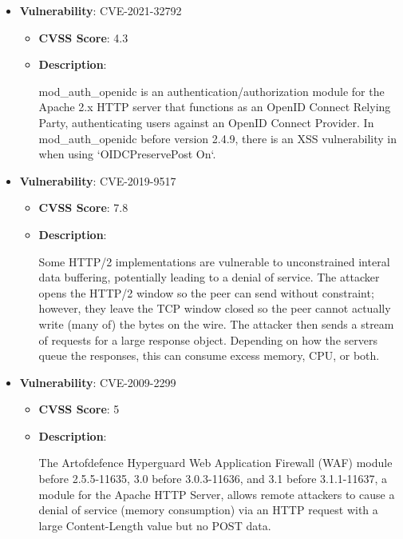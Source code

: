 \documentclass{article}
\begin{document}
\begin{itemize}
        \item \textbf{Vulnerability}: CVE-2021-32792
        \begin{itemize}
            \item \textbf{CVSS Score}:  4.3 
            \item \textbf{Description}:
            \parbox[t]{0.9\linewidth}{
                \ttfamily mod\_auth\_openidc is an authentication/authorization module for the Apache 2.x HTTP server that functions as an OpenID Connect Relying Party, authenticating users against an OpenID Connect Provider. In mod\_auth\_openidc before version 2.4.9, there is an XSS vulnerability in when using `OIDCPreservePost On`.
            }
        \end{itemize}
    
        \item \textbf{Vulnerability}: CVE-2019-9517
        \begin{itemize}
            \item \textbf{CVSS Score}:  7.8 
            \item \textbf{Description}:
            \parbox[t]{0.9\linewidth}{
                \ttfamily Some HTTP/2 implementations are vulnerable to unconstrained interal data buffering, potentially leading to a denial of service. The attacker opens the HTTP/2 window so the peer can send without constraint; however, they leave the TCP window closed so the peer cannot actually write (many of) the bytes on the wire. The attacker then sends a stream of requests for a large response object. Depending on how the servers queue the responses, this can consume excess memory, CPU, or both.
            }
        \end{itemize}
    
        \item \textbf{Vulnerability}: CVE-2009-2299
        \begin{itemize}
            \item \textbf{CVSS Score}:  5 
            \item \textbf{Description}:
            \parbox[t]{0.9\linewidth}{
                \ttfamily The Artofdefence Hyperguard Web Application Firewall (WAF) module before 2.5.5-11635, 3.0 before 3.0.3-11636, and 3.1 before 3.1.1-11637, a module for the Apache HTTP Server, allows remote attackers to cause a denial of service (memory consumption) via an HTTP request with a large Content-Length value but no POST data.
            }
        \end{itemize}
    

\end{itemize}
\end{document}
